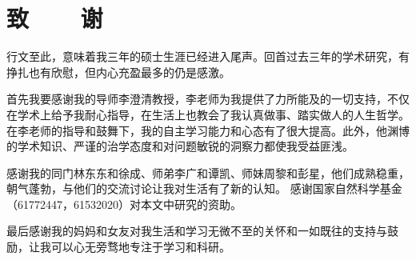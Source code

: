 ﻿\chapter*{致~~~~谢}

行文至此，意味着我三年的硕士生涯已经进入尾声。回首过去三年的学术研究，有挣扎也有欣慰，但内心充盈最多的仍是感激。

首先我要感谢我的导师李澄清教授，李老师为我提供了力所能及的一切支持，不仅在学术上给予我耐心指导，在生活上也教会了我认真做事、踏实做人的人生哲学。
在李老师的指导和鼓舞下，我的自主学习能力和心态有了很大提高。此外，他渊博的学术知识、严谨的治学态度和对问题敏锐的洞察力都使我受益匪浅。

感谢我的同门林东东和徐成、师弟李广和谭凯、师妹周黎和彭星，他们成熟稳重，朝气蓬勃，与他们的交流讨论让我对生活有了新的认知。
感谢国家自然科学基金（61772447，61532020）对本文中研究的资助。

最后感谢我的妈妈和女友对我生活和学习无微不至的关怀和一如既往的支持与鼓励，让我可以心无旁骛地专注于学习和科研。